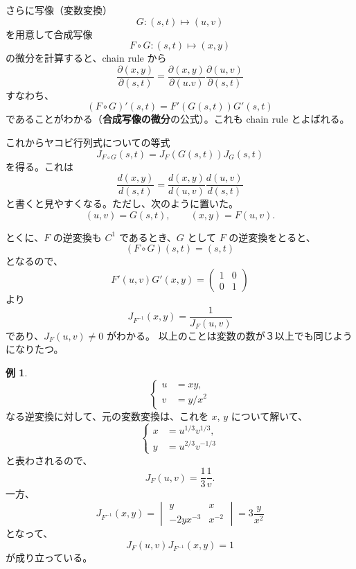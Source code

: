 \documentclass[a4paper]{jsarticle}
\theoremstyle{definition}
\newtheorem{Example}[Theorem]{例}
\theoremstyle{remark}
\newcommand{\del}{\partial}
\begin{document}
さらに写像（変数変換）
\[
G: (s,t) \mapsto (u,v)
\]
を用意して合成写像
\[
F\circ G: (s,t) \mapsto (x,y)
\]
の微分を計算すると、chain rule から
\[
  \frac{\del(x,y)}{\del(s,t)} = \frac{\del(x,y)}{\del(u.v)} \frac{\del(u,v)}{\del(s,t)}
\]
すなわち、
\[
(F\circ G)'(s,t) = F'(G(s,t)) G'(s,t)
\]
であることがわかる（\textbf{合成写像の微分}の公式）。これも chain rule とよばれる。

これからヤコビ行列式についての等式
\[
J_{F\circ G}(s,t) = J_F(G(s,t)) J_G(s,t)
\]
を得る。これは
\[
\frac{d(x,y)}{d(s,t)} = \frac{d(x,y)}{d(u,v)} 
\frac{d(u,v)}{d(s,t)}
\]
と書くと見やすくなる。ただし、次のように置いた。
\[
(u,v) = G(s,t),\qquad (x,y) = F(u,v). 
\]

とくに、$F$ の逆変換も $C^1$ であるとき、$G$ として $F$ の逆変換をとると、
\[
(F\circ G)(s,t) = (s,t)
\]
となるので、
\[
F'(u,v)G'(x,y) = 
\begin{pmatrix}
1 & 0\\
0 & 1
\end{pmatrix}
\]
より
\[
J_{F^{-1}}(x,y) = \frac{1}{J_F(u,v)}
\]
であり、$J_F(u,v) \not= 0$ がわかる。
以上のことは変数の数が３以上でも同じようになりたつ。

\begin{Example}
\[
\begin{cases}
u &= xy,\\
v &= y/x^2
\end{cases}
\]
なる逆変換に対して、元の変数変換は、これを $x$, $y$ について解いて、
\[
\begin{cases}
x &= u^{1/3}v^{1/3},\\
y &= u^{2/3}v^{-1/3} 
\end{cases}
\]
と表わされるので、
\[
J_F(u,v) = \frac{1}{3} \frac{1}{v}. 
\]
一方、
\[
J_{F^{-1}}(x,y) = 
\begin{vmatrix}
y & x\\
-2yx^{-3} & x^{-2}
\end{vmatrix}
= 3\frac{y}{x^2}
\]
となって、
\[
J_F(u,v) J_{F^{-1}}(x,y) = 1
\]
が成り立っている。
\end{Example}
\end{document}
